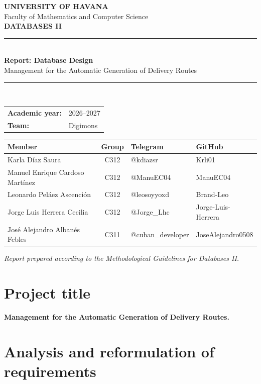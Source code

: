 \documentclass[12pt,a4paper]{article}
\begin{document}
\begin{titlepage}
\thispagestyle{empty}
\begin{center}
\vspace*{1cm}
{\Large \textbf{UNIVERSITY OF HAVANA}}\\[0.35cm]
{\large Faculty of Mathematics and Computer Science}\\[1.6cm]
{\Large \textbf{DATABASES II}}\\[1.5cm]
{\rule{\textwidth}{1pt}}\\[0.5cm]
{\huge \textbf{Report: Database Design}}\\[0.45cm]
{\Large Management for the Automatic Generation of Delivery Routes}\\[0.5cm]
{\rule{\textwidth}{1pt}}\\[1.5cm]
\begin{tabular}{ll}
\textbf{Academic year:} & 2026--2027 \\
\textbf{Team:} & Digimons
\end{tabular}
\vfill
\small
\begin{tabular}{>{\raggedright\arraybackslash}p{6.6cm}c p{3.1cm} p{3.7cm}}
\toprule
\textbf{Member} & \textbf{Group} & \textbf{Telegram} & \textbf{GitHub}\\
\midrule
Karla Díaz Saura & C312 & @kdiazsr & Krli01\\
Manuel Enrique Cardoso Martínez & C312 & @ManuEC04 & ManuEC04\\
Leonardo Peláez Ascención & C312 & @leosoyyoxd & Brand-Leo\\
Jorge Luis Herrera Cecilia & C312 & @Jorge\_Lhc & Jorge-Luis-Herrera\\
José Alejandro Albanés Febles & C311 & @cuban\_developer & JoseAlejandro0508\\
\bottomrule
\end{tabular}
\vfill
\textit{Report prepared according to the Methodological Guidelines for Databases II.}
\end{center}
\end{titlepage}

\tableofcontents
\newpage

\section{Project title}
\textbf{Management for the Automatic Generation of Delivery Routes.}

\section{Analysis and reformulation of requirements}
\end{document}
